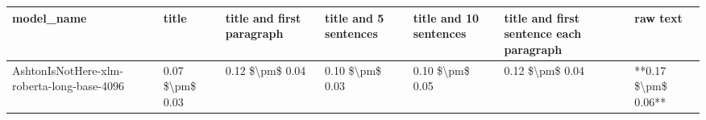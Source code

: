 \begin{tabular}{lllllll}
\toprule
                                model\_name &           title & title and first paragraph & title and 5 sentences & title and 10 sentences & title and first sentence each paragraph &            raw text \\
\midrule
AshtonIsNotHere-xlm-roberta-long-base-4096 & 0.07 \$\textbackslash pm\$ 0.03 &           0.12 \$\textbackslash pm\$ 0.04 &       0.10 \$\textbackslash pm\$ 0.03 &        0.10 \$\textbackslash pm\$ 0.05 &                         0.12 \$\textbackslash pm\$ 0.04 & **0.17 \$\textbackslash pm\$ 0.06** \\
\bottomrule
\end{tabular}
